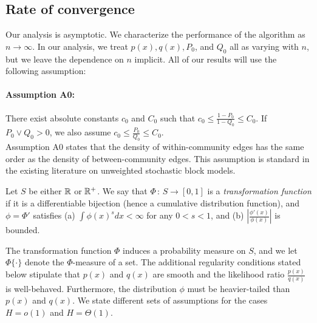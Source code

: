 \documentclass{article}
\begin{document}
\subsection{Rate of convergence}

Our analysis is asymptotic. We characterize the performance of the algorithm as $n \rightarrow \infty$. In our analysis, we treat $p(x), q(x), P_0$, and $Q_0$ all as varying with $n$, but we leave the dependence on $n$ implicit. All of our results will use the following assumption:

\paragraph{\textbf{Assumption A0:}} There exist absolute constants $c_0$ and $C_0$ such that $c_0 \leq \frac{1-P_0}{1-Q_0} \leq C_0$. If $P_0 \vee Q_0 > 0$, we also assume $c_0 \leq \frac{P_0}{Q_0} \leq C_0$.\\

Assumption A0 states that the density of within-community edges has the same order as the density of between-community edges. This assumption is standard in the existing literature on unweighted stochastic block models.


\begin{definition}
Let $S$ be either ${\mathbb R}$ or ${\mathbb R}^+$. We say that $\Phi \,:\, S \rightarrow [0,1]$ is a \emph{transformation function} if it is a differentiable bijection (hence a cumulative distribution function), and $\phi = \Phi'$ satisfies (a) $\int \phi(x)^s dx < \infty$ for any $0 < s < 1$, and (b) $\left| \frac{\phi'(x)}{\phi(x)} \right|$ is bounded. 
\end{definition}

The transformation function $\Phi$ induces a probability measure on $S$, and we let $\Phi \{ \cdot \}$ denote the $\Phi$-measure of a set. The additional regularity conditions stated below stipulate that $p(x)$ and $q(x)$ are smooth and the likelihood ratio $\frac{p(x)}{q(x)}$ is well-behaved. Furthermore, the distribution $\phi$ must be heavier-tailed than $p(x)$ and $q(x)$. We state different sets of assumptions for the cases $H = o(1)$ and $H = \Theta(1)$.
\end{document}
